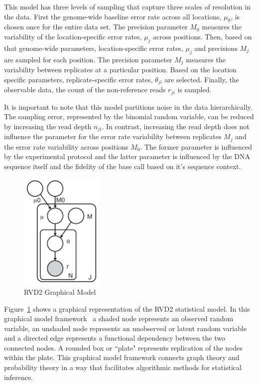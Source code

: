 \documentclass[11pt,reqno]{amsart}
\begin{document}
This model has three levels of sampling that capture three scales of resolution in the data. First the genome-wide baseline error rate across all locations, $\mu_0$,  is chosen once for the entire data set. The precision parameter $M_0$ measures the variability of the location-specific error rates, $\mu_j$ across positions. Then, based on that genome-wide parameters, location-specific error rates, $\mu_j$ and precisions $M_j$ are sampled for each position. The precision parameter $M_j$ measures the variability between replicates at a particular position. Based on the location specific parameters, replicate-specific error rates, $\theta_{ji}$ are selected. Finally, the observable data, the count of the non-reference reads  $r_{ji}$ is sampled.

It is important to note that this model partitions noise in the data hierarchically. The sampling error, represented by the binomial random variable, can be reduced by increasing the read depth $n_{ji}$. In contrast, increasing the read depth does not influence the parameter for the error rate variability between replicates $M_j$ and the error rate variability across positions $M_0$. The former parameter is influenced by the experimental protocol and the latter parameter is influenced by the DNA sequence itself and the fidelity of the base call based on it's sequence context.

\begin{figure}[h]
\begin{center}
\includegraphics[width=40mm]{pdf_figs/RVD2_model.pdf}
\caption{RVD2 Graphical Model}
\label{fig:graphical_model}
\end{center}
\end{figure}

Figure~\ref{fig:graphical_model} shows a graphical representation of the RVD2 statistical model. In this graphical model framework~\cite{} a shaded node represents an observed random variable, an unshaded node represents an unobserved or latent random variable and a directed edge represents a functional dependency between the two connected nodes. A rounded box or ``plate" represents replication of the nodes within the plate. This graphical model framework connects graph theory and probability theory in a way that facilitates algorithmic methods for statistical inference.
\end{document}
